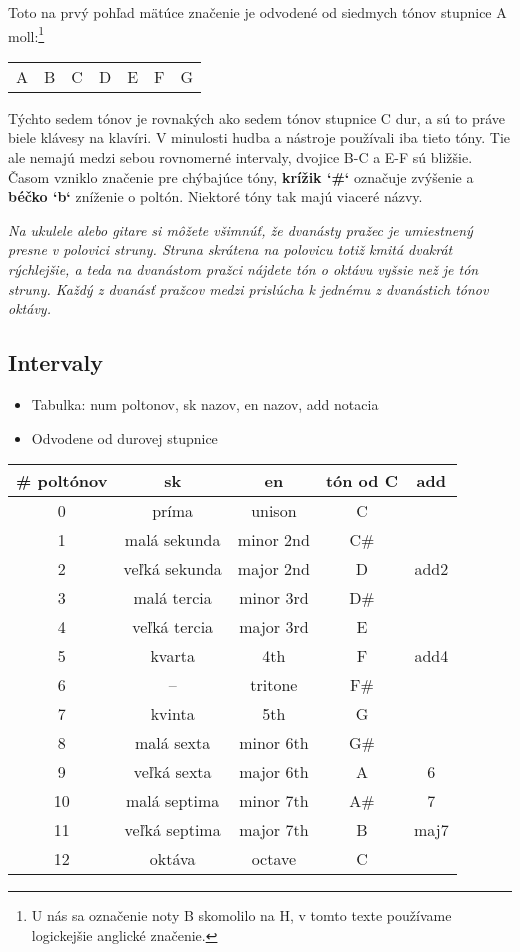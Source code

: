 Toto na prvý pohľad mätúce značenie je odvodené od siedmych tónov stupnice A moll:\footnote{U nás sa označenie noty B skomolilo na H, v tomto texte používame logickejšie anglické značenie.}

\begin{center}
\begin{tabular}{ C{2em} C{2em} C{2em} C{2em} C{2em} C{2em} C{2em} }
    A & B & C & D & E & F & G \\
\end{tabular}
\end{center}

Týchto sedem tónov je rovnakých ako sedem tónov stupnice C dur, a sú to práve biele klávesy na klavíri.
V minulosti hudba a nástroje používali iba tieto tóny. Tie ale nemajú medzi sebou rovnomerné
intervaly, dvojice B-C a E-F sú bližšie. Časom vzniklo značenie pre chýbajúce tóny,
\textbf{krížik `\#`} označuje zvýšenie a \textbf{béčko `b`} zníženie o poltón. Niektoré tóny tak majú
viaceré názvy.

\textit{%
Na ukulele alebo gitare si môžete všimnúť, že dvanásty pražec je umiestnený presne v polovici struny.
Struna skrátena na polovicu totiž kmitá dvakrát rýchlejšie, a teda na dvanástom pražci nájdete tón
o oktávu vyšsie než je tón struny. Každý z dvanásť pražcov medzi prislúcha k jednému z dvanástich tónov
oktávy.
}


\subsection*{Intervaly}


\begin{itemize}
    \item Tabulka: num poltonov, sk nazov, en nazov, add notacia
    \item Odvodene od durovej stupnice
\end{itemize}

\begin{tabular}{ c c c c c }
    \# poltónov & sk & en & tón od C & add \\ 
    \hline
    0 & príma & unison & C & \\ 
    1 & malá sekunda & minor 2nd & C\# & \\ 
    2 & veľká sekunda & major 2nd & D & add2 \\ 
    3 & malá tercia & minor 3rd & D\# & \\ 
    4 & veľká tercia & major 3rd & E & \\ 
    5 & kvarta & 4th & F & add4 \\ 
    6 & -- & tritone & F\# & \\ 
    7 & kvinta & 5th & G & \\ 
    8 & malá sexta & minor 6th & G\# & \\ 
    9 & veľká sexta & major 6th & A & 6 \\ 
    10 & malá septima & minor 7th & A\# & 7 \\ 
    11 & veľká septima & major 7th & B & maj7 \\ 
    12 & oktáva & octave & C & \\ 
\end{tabular}


